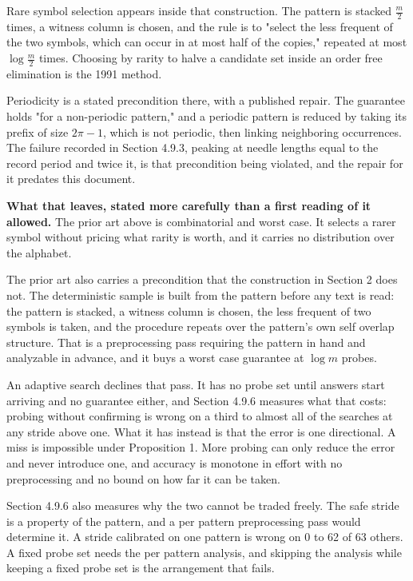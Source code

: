 Rare symbol selection appears inside that construction. The pattern is stacked \(\tfrac{m}{2}\) times, a witness column is chosen, and the rule is to "select the less frequent of the two symbols, which can occur in at most half of the copies," repeated at most \(\log \tfrac{m}{2}\) times. Choosing by rarity to halve a candidate set inside an order free elimination is the 1991 method.

Periodicity is a stated precondition there, with a published repair. The guarantee holds "for a non-periodic pattern," and a periodic pattern is reduced by taking its prefix of size \(2\pi-1\), which is not periodic, then linking neighboring occurrences. The failure recorded in Section 4.9.3, peaking at needle lengths equal to the record period and twice it, is that precondition being violated, and the repair for it predates this document.

\textbf{What that leaves, stated more carefully than a first reading of it allowed.} The prior art above is combinatorial and worst case. It selects a rarer symbol without pricing what rarity is worth, and it carries no distribution over the alphabet.

The prior art also carries a precondition that the construction in Section 2 does not. The deterministic sample is built from the pattern before any text is read: the pattern is stacked, a witness column is chosen, the less frequent of two symbols is taken, and the procedure repeats over the pattern's own self overlap structure. That is a preprocessing pass requiring the pattern in hand and analyzable in advance, and it buys a worst case guarantee at \(\log m\) probes.

An adaptive search declines that pass. It has no probe set until answers start arriving and no guarantee either, and Section 4.9.6 measures what that costs: probing without confirming is wrong on a third to almost all of the searches at any stride above one. What it has instead is that the error is one directional. A miss is impossible under Proposition 1. More probing can only reduce the error and never introduce one, and accuracy is monotone in effort with no preprocessing and no bound on how far it can be taken.

Section 4.9.6 also measures why the two cannot be traded freely. The safe stride is a property of the pattern, and a per pattern preprocessing pass would determine it. A stride calibrated on one pattern is wrong on 0 to 62 of 63 others. A fixed probe set needs the per pattern analysis, and skipping the analysis while keeping a fixed probe set is the arrangement that fails.

